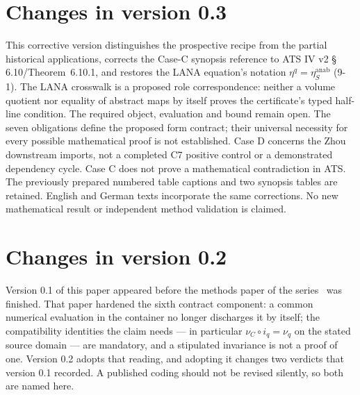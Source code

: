 \documentclass[11pt,a4paper]{article}
\theoremstyle{definition}
\begin{document}
\clearpage
\tableofcontents
\clearpage

\section*{Changes in version 0.3}
\label{sec:changes03}

This corrective version distinguishes the prospective recipe from the partial
historical applications, corrects the Case-C synopsis reference to ATS IV v2
\S\,6.10/Theorem~6.10.1, and restores the LANA equation's notation
$\eta^q=\eta_S^{\mathrm{anab}}$ (9-1).
The LANA crosswalk is a proposed role correspondence: neither a volume quotient
nor equality of abstract maps by itself proves the certificate's typed
half-line condition. The required object, evaluation and bound remain open.
The seven obligations define the proposed form contract; their universal
necessity for every possible mathematical proof is not established.
Case D concerns the Zhou downstream imports, not a completed C7 positive
control or a demonstrated dependency cycle. Case C does not prove a
mathematical contradiction in ATS.
The previously prepared numbered table captions and two synopsis tables
are retained. English and German texts incorporate the same corrections.
No new mathematical result or independent method validation is claimed.

\medskip

\section*{Changes in version 0.2}
\label{sec:changes02}

Version 0.1 of this paper appeared before the methods paper of the
series~\cite{GeigerBCM2026} was finished. That paper hardened the sixth contract
component: a common numerical evaluation in the container no longer discharges
it by itself; the compatibility identities the claim needs --- in particular
$\nu_C \circ i_q = \nu_q$ on the stated source domain --- are mandatory, and a
stipulated invariance is not a proof of one. Version 0.2 adopts that reading,
and adopting it changes two verdicts that version 0.1 recorded. A published
coding should not be revised silently, so both are named here.
\end{document}
